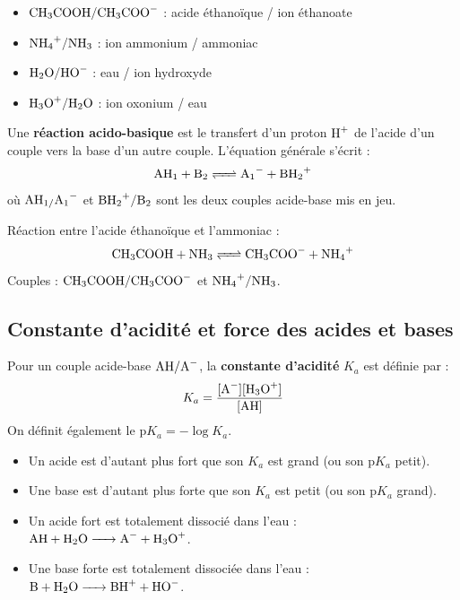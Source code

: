 \begin{exemple}
\begin{itemize}
    \item $\ce{CH3COOH/CH3COO-}$ : acide éthanoïque / ion éthanoate
    \item $\ce{NH4+/NH3}$ : ion ammonium / ammoniac
    \item $\ce{H2O/HO-}$ : eau / ion hydroxyde
    \item $\ce{H3O+/H2O}$ : ion oxonium / eau
\end{itemize}
\end{exemple}

\begin{loi}
Une \textbf{réaction acido-basique} est le transfert d'un proton $\ce{H+}$ de l'acide d'un couple vers la base d'un autre couple. L'équation générale s'écrit :
\[\ce{AH1 + B2 <=> A1- + BH2+}\]
où $\ce{AH1/A1-}$ et $\ce{BH2+/B2}$ sont les deux couples acide-base mis en jeu.
\end{loi}

\begin{exemple}
Réaction entre l'acide éthanoïque et l'ammoniac :
\[\ce{CH3COOH + NH3 <=> CH3COO- + NH4+}\]
Couples : $\ce{CH3COOH/CH3COO-}$ et $\ce{NH4+/NH3}$.
\end{exemple}

\subsection{Constante d'acidité et force des acides et bases}

\begin{definition}
Pour un couple acide-base $\ce{AH/A-}$, la \textbf{constante d'acidité} $K_a$ est définie par :
\[K_a = \frac{[\ce{A-}][\ce{H3O+}]}{[\ce{AH}]}\]
On définit également le $\mathrm{p}K_a = -\log K_a$.
\end{definition}

\begin{propriete}
\begin{itemize}
    \item Un acide est d'autant plus fort que son $K_a$ est grand (ou son $\mathrm{p}K_a$ petit).
    \item Une base est d'autant plus forte que son $K_a$ est petit (ou son $\mathrm{p}K_a$ grand).
    \item Un acide fort est totalement dissocié dans l'eau : $\ce{AH + H2O -> A- + H3O+}$.
    \item Une base forte est totalement dissociée dans l'eau : $\ce{B + H2O -> BH+ + HO-}$.
\end{itemize}
\end{propriete}

